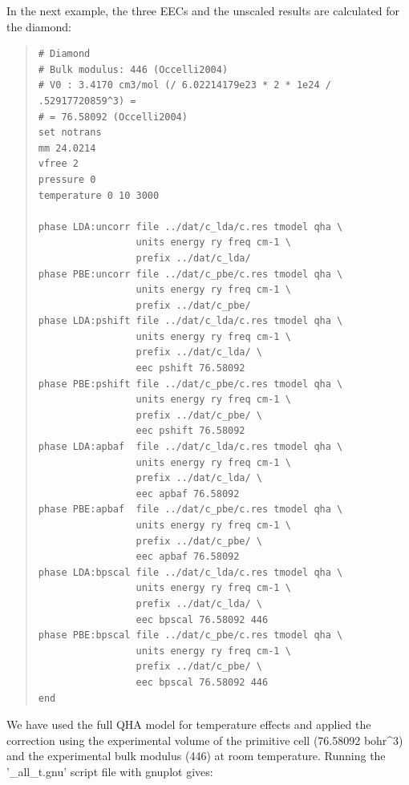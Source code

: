 \documentclass[a4paper]{article}
\begin{document}
In the next example, the three EECs and the unscaled results are
calculated for the diamond:
%
\begin{quote}
\begin{verbatim}
# Diamond
# Bulk modulus: 446 (Occelli2004)
# V0 : 3.4170 cm3/mol (/ 6.02214179e23 * 2 * 1e24 / .52917720859^3) =
# = 76.58092 (Occelli2004)
set notrans
mm 24.0214
vfree 2
pressure 0
temperature 0 10 3000

phase LDA:uncorr file ../dat/c_lda/c.res tmodel qha \
                 units energy ry freq cm-1 \
                 prefix ../dat/c_lda/
phase PBE:uncorr file ../dat/c_pbe/c.res tmodel qha \
                 units energy ry freq cm-1 \
                 prefix ../dat/c_pbe/
phase LDA:pshift file ../dat/c_lda/c.res tmodel qha \
                 units energy ry freq cm-1 \
                 prefix ../dat/c_lda/ \
                 eec pshift 76.58092
phase PBE:pshift file ../dat/c_pbe/c.res tmodel qha \
                 units energy ry freq cm-1 \
                 prefix ../dat/c_pbe/ \
                 eec pshift 76.58092
phase LDA:apbaf  file ../dat/c_lda/c.res tmodel qha \
                 units energy ry freq cm-1 \
                 prefix ../dat/c_lda/ \
                 eec apbaf 76.58092
phase PBE:apbaf  file ../dat/c_pbe/c.res tmodel qha \
                 units energy ry freq cm-1 \
                 prefix ../dat/c_pbe/ \
                 eec apbaf 76.58092
phase LDA:bpscal file ../dat/c_lda/c.res tmodel qha \
                 units energy ry freq cm-1 \
                 prefix ../dat/c_lda/ \
                 eec bpscal 76.58092 446
phase PBE:bpscal file ../dat/c_pbe/c.res tmodel qha \
                 units energy ry freq cm-1 \
                 prefix ../dat/c_pbe/ \
                 eec bpscal 76.58092 446
end
\end{verbatim}
\end{quote}

We have used the full QHA model for temperature effects and applied
the correction using the experimental volume of the primitive cell
(76.58092 bohr\textasciicircum{}3) and the experimental bulk modulus (446) at room
temperature. Running the '\_all\_t.gnu' script file with gnuplot gives:

\noindent{}
\end{document}
